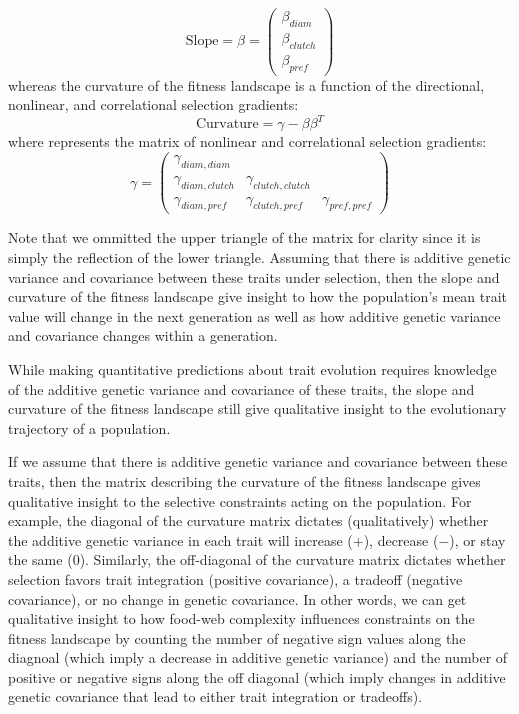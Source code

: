 \documentclass[11pt]{article}
\begin{document}
$$\text{Slope} = \beta = \begin{pmatrix} \beta_{diam} \\ \beta_{clutch} \\ \beta_{pref} \end{pmatrix} $$
whereas the curvature of the fitness landscape is a function of the directional, nonlinear, and correlational selection gradients: 
$$\text{Curvature} = \gamma - \beta \beta^T$$
where \gamma represents the matrix of nonlinear and correlational selection gradients:
$$\gamma = \begin{pmatrix} \gamma_{diam,diam}&& \\ \gamma_{diam,clutch}&\gamma_{clutch,clutch}& \\ \gamma_{diam,pref} & \gamma_{clutch,pref} &\gamma_{pref,pref} \end{pmatrix}$$

Note that we ommitted the upper triangle of the matrix for clarity since it is simply the reflection of the lower triangle. Assuming that there is additive genetic variance and covariance between these traits under selection, then the slope and curvature of the fitness landscape give insight to how the population's mean trait value will change in the next generation as well as how additive genetic variance and covariance changes within a generation.

While making quantitative predictions about trait evolution requires knowledge of the additive genetic variance and covariance of these traits, the slope and curvature of the fitness landscape still give qualitative insight to the evolutionary trajectory of a population. 

If we assume that there is additive genetic variance and covariance between these traits, then the matrix describing the curvature of the fitness landscape gives qualitative insight to the selective constraints acting on the population. For example, the diagonal of the curvature matrix dictates (qualitatively) whether the additive genetic variance in each trait will increase ($+$), decrease ($-$), or stay the same ($0$). Similarly, the off-diagonal of the curvature matrix dictates whether selection favors trait integration (positive covariance), a tradeoff (negative covariance), or no change in genetic covariance. In other words, we can get qualitative insight to how food-web complexity influences constraints on the fitness landscape by counting the number of negative sign values along the diagnoal (which imply a decrease in additive genetic variance) and the number of positive or negative signs along the off diagonal (which imply changes in additive genetic covariance that lead to either trait integration or tradeoffs).  
\end{document}
